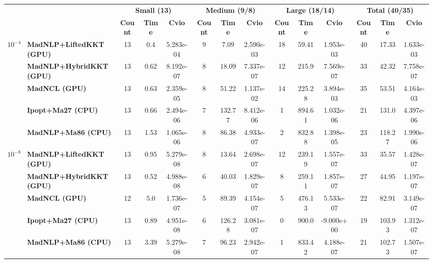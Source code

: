 \begin{center}
\renewcommand{\arraystretch}{0.9}
\begin{tabular}{|l|l|ccc|ccc|ccc|ccc|}
\hline
 & & \multicolumn{3}{c|}{\textbf{Small (13)}} & \multicolumn{3}{c|}{\textbf{Medium (9/8)}} & \multicolumn{3}{c|}{\textbf{Large (18/14)}} & \multicolumn{3}{c|}{\textbf{Total (40/35)}} \\
 & & \textbf{Count} & \textbf{Time} & \textbf{Cvio} & \textbf{Count} & \textbf{Time} & \textbf{Cvio} & \textbf{Count} & \textbf{Time} & \textbf{Cvio} & \textbf{Count} & \textbf{Time} & \textbf{Cvio}\\
\hline
\multirow{5}{*}{\Large\textbf{$10^{-4}$}} & \textbf{MadNLP+LiftedKKT (GPU)} & \cellcolor{blue!15}13 & \cellcolor{blue!15}0.4 & 5.283e-04 & \cellcolor{blue!15}9 & \cellcolor{blue!15}7.09 & 2.590e-03 & \cellcolor{blue!15}18 & \cellcolor{blue!15}59.41 & 1.953e-03 & \cellcolor{blue!15}40 & \cellcolor{blue!15}17.33 & 1.633e-03 \\
 & \textbf{MadNLP+HybridKKT (GPU)} & \cellcolor{blue!15}13 & 0.62 & \cellcolor{blue!15}8.192e-07 & 8 & 18.09 & 7.337e-07 & 12 & 215.9 & \cellcolor{blue!15}7.569e-07 & 33 & 42.32 & \cellcolor{blue!15}7.758e-07 \\
 & \textbf{MadNCL (GPU)} & \cellcolor{blue!15}13 & 0.63 & 2.359e-05 & 8 & 51.22 & 1.137e-02 & 14 & 225.28 & 3.894e-03 & 35 & 53.51 & 4.164e-03 \\
 & \textbf{Ipopt+Ma27 (CPU)} & \cellcolor{blue!15}13 & 0.66 & 2.494e-06 & 7 & 132.77 & 8.412e-06 & 1 & 894.61 & 1.032e-06 & 21 & 131.0 & 4.397e-06 \\
 & \textbf{MadNLP+Ma86 (CPU)} & \cellcolor{blue!15}13 & 1.53 & 1.065e-06 & 8 & 86.38 & \cellcolor{blue!15}4.933e-07 & 2 & 832.88 & 1.398e-05 & 23 & 118.27 & 1.990e-06 \\
\hline
\multirow{5}{*}{\Large\textbf{$10^{-8}$}} & \textbf{MadNLP+LiftedKKT (GPU)} & \cellcolor{blue!15}13 & 0.95 & 5.279e-08 & \cellcolor{blue!15}8 & \cellcolor{blue!15}13.64 & 2.698e-07 & \cellcolor{blue!15}12 & \cellcolor{blue!15}239.19 & 1.557e-07 & \cellcolor{blue!15}33 & \cellcolor{blue!15}35.57 & 1.428e-07 \\
 & \textbf{MadNLP+HybridKKT (GPU)} & \cellcolor{blue!15}13 & \cellcolor{blue!15}0.52 & 4.988e-08 & 6 & 40.03 & \cellcolor{blue!15}1.829e-07 & 8 & 259.11 & 1.857e-07 & 27 & 44.95 & \cellcolor{blue!15}1.197e-07 \\
 & \textbf{MadNCL (GPU)} & 12 & 5.0 & 1.736e-07 & 5 & 89.39 & 4.154e-07 & 5 & 476.13 & 5.533e-07 & 22 & 82.91 & 3.149e-07 \\
 & \textbf{Ipopt+Ma27 (CPU)} & \cellcolor{blue!15}13 & 0.89 & \cellcolor{blue!15}4.951e-08 & 6 & 126.28 & 3.081e-07 & 0 & 900.0 & \cellcolor{blue!15}-9.000e+00 & 19 & 103.93 & 1.312e-07 \\
 & \textbf{MadNLP+Ma86 (CPU)} & \cellcolor{blue!15}13 & 3.39 & 5.279e-08 & 7 & 96.23 & 2.942e-07 & 1 & 833.42 & 4.188e-07 & 21 & 102.73 & 1.507e-07 \\
\hline
\end{tabular}
\end{center}
